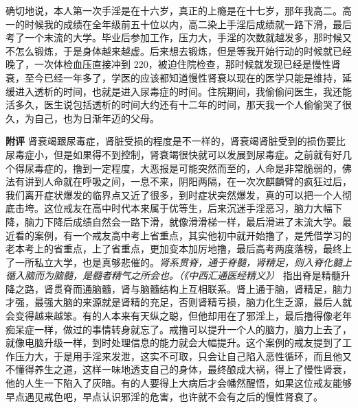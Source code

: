 \begin{case}
    确切地说，本人第一次手淫是在十六岁，真正的上瘾是在十七岁，那年我高二。高一的时候我的成绩在全年级前五十位以内，高二染上手淫后成绩就一路下滑，最后考了一个末流的大学。毕业后参加工作，压力大，手淫的次数就越发多，那时候又不怎么锻炼，于是身体越来越虚。后来想去锻炼，但是等我开始行动的时候就已经晚了，一次体检血压直接冲到 220，被迫住院检查，那时候就发现已经是慢性肾衰，至今已经一年多了，学医的应该都知道慢性肾衰以现在的医学只能是维持，延缓进入透析的时间，也就是进入尿毒症的时间。住院期间，我偷偷问医生，我还能活多久，医生说包括透析的时间大约还有十二年的时间，那天我一个人偷偷哭了很久，为自己，也为日渐年迈的父母。

    \textbf{附评} 肾衰竭跟尿毒症，肾脏受损的程度是不一样的，肾衰竭肾脏受到的损伤要比尿毒症小，但是如果得不到控制，肾衰竭很快就可以发展到尿毒症。之前就有好几个得尿毒症的，撸到一定程度，大恶报是可能突然而至的，人命是非常脆弱的，佛法有讲到人命就在呼吸之间，一息不来，阴阳两隔，在一次次麒麟臂的疯狂过后，我们离开症状爆发的临界点又近了很多，到时症状突然爆发，真的可以把一个人彻底击垮。这位戒友在高中时代本来属于优等生，后来沉迷手淫恶习，脑力大幅下降，脑力下降后成绩自然会一路下滑，就像滑滑梯一样，最后滑进了末流大学。最近看的案例，有一个戒友高中考上省重点，其实他初中就开始撸了，是凭借学习的老本考上的省重点，上了省重点，更加变本加厉地撸，最后高考两度落榜，最终上了一所私立大学，也是真够悲催的。\textit{肾系贯脊，通于脊髓，肾精足，则入脊化髓上循入脑而为脑髓，是髓者精气之所会也。（《中西汇通医经精义》）} 指出脊是精髓升降之路，肾贯脊而通脑髓，肾与脑髓结构上互相联系。肾上通于脑，肾精足，脑力才强，最强大脑的来源就是肾精的充足，否则肾精亏损，脑力化生乏源，最后人就会变得越来越笨。有的人本来有天纵之聪，但他却用在了邪淫上，最后撸得像老年痴呆症一样，做过的事情转身就忘了。戒撸可以提升一个人的脑力，脑力上去了，就像电脑升级一样，到时处理信息的能力就会大幅提升。这个案例的戒友提到了工作压力大，于是用手淫来发泄，这实不可取，只会让自己陷入恶性循环，而且他又不懂得养生之道，这样一味地透支自己的身体，最终酿成大祸，得上了慢性肾衰，他的人生一下陷入了灰暗。有的人要得上大病后才会幡然醒悟，如果这位戒友能够早点遇见戒色吧，早点认识邪淫的危害，也许就不会有之后的慢性肾衰了。
\end{case}


